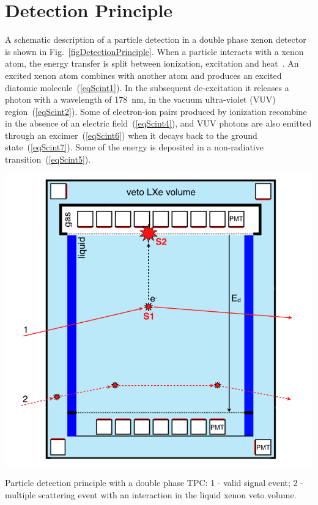 \section{Detection Principle}
\label{secDetectionPrinciple}

A schematic description of a particle detection in a double phase xenon detector is shown in Fig.~\ref{figDetectionPrinciple}. When a particle interacts with a xenon atom, the energy transfer is split between ionization, excitation and heat~\cite{ScintillationProcesses1, ScintillationProcesses2, ScintillationProcesses3}. An excited xenon atom combines with another atom and produces an excited diatomic molecule~(\ref{eqScint1}). In the subsequent de-excitation it releases a photon with a wavelength of 178~nm, in the vacuum ultra-violet (VUV) region~(\ref{eqScint2}). Some of  electron-ion pairs produced by ionization recombine in the absence of an electric field~(\ref{eqScint4}), and VUV photons are also emitted through an excimer~(\ref{eqScint6}) when it decays back to the ground state~(\ref{eqScint7}).  Some of the energy is deposited in a non-radiative transition~(\ref{eqScint5}). 

\begin{floatingfigure}[l]{0.495\textwidth}
\centering
\includegraphics[width=0.495\linewidth]{plots/DetectionPrinciple/DetectionPrincipleWithLabels.png}
\caption[Particle detection principle with a double phase TPC]{Particle detection principle with a double phase TPC: 1 - valid signal event; 2 - multiple scattering event with an interaction in the liquid xenon veto volume.}
\label{figDetectionPrinciple}
\end{floatingfigure}

